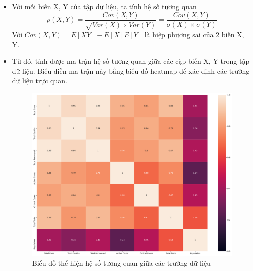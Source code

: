 \documentclass[a4paper, 12pt]{article}
\begin{document}
    \begin{itemize}
        \item Với mỗi biến X, Y của tập dữ liệu, ta tính hệ số tương quan 
        \begin{equation}
            \rho(X, Y) = \frac{Cov(X, Y)}{\sqrt{Var(X)\times Var(Y)}} = \frac{Cov(X, Y)}{\sigma(X)\times \sigma(Y)}
        \end{equation}
        Với $Cov(X,Y) = E[XY] - E[X]E[Y]$ là hiệp phương sai của 2 biến X, Y.

        \item Từ đó, tính được ma trận hệ số tương quan giữa các cặp biến X, Y trong tập dữ liệu. Biểu diễn ma trận này bằng biểu đồ heatmap để xác định các trường dữ liệu trực quan.
        \begin{figure}[H]
            \begin{center}
                \includegraphics[scale = 0.3]{img/heatmap.png}
                \caption{Biểu đồ thể hiện hệ số tương quan giữa các trường dữ liệu}
            \end{center}
        \end{figure}


\end{itemize}
\end{document}
